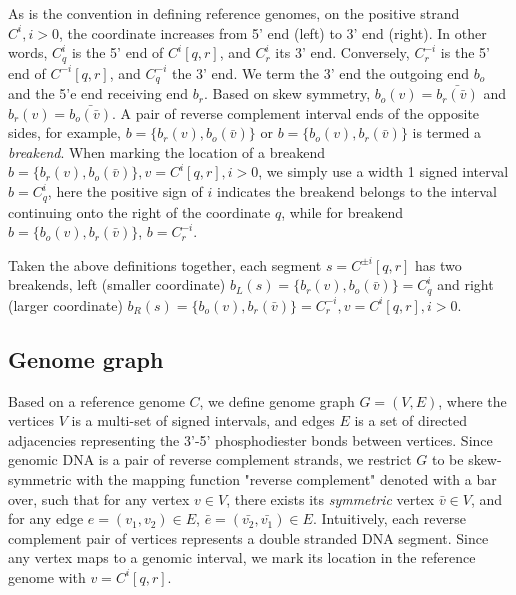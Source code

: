 \documentclass[phd,tocprelim]{cornell}
\begin{document}
As is the convention in defining reference genomes, on the positive strand $C^i, i>0$, the coordinate increases from 5' end (left) to 3' end (right). In other words, $C^{i}_q$ is the 5' end of $C^{i}[q,r]$, and $C^{i}_r$ its 3' end. Conversely, $C^{-i}_r$ is the 5' end of $C^{-i}[q,r]$, and $C^{-i}_q$ the 3' end. We term the 3' end the outgoing end $b_o$ and the 5'e end receiving end $b_r$. Based on skew symmetry, $b_o (v)= \bar{b_r(\bar{v})}$ and $b_r(v) = \bar{b_o(\bar{v})}$. A pair of reverse complement interval ends of the opposite sides, for example, $b = \{b_r(v), b_o(\bar{v})\}$ or $b = \{b_o(v), b_r(\bar{v})\}$ is termed a \textit{breakend}. When marking the location of a breakend $b = \{b_r(v), b_o(\bar{v})\}, v = C^{i}[q,r], i>0$, we simply use a width 1 signed interval $b = C^{i}_{q}$, here the positive sign of $i$ indicates the breakend belongs to the interval continuing onto the right of the coordinate $q$, while for breakend $b = \{b_o(v), b_r(\bar{v})\}$, $b = C^{-i}_r$.

Taken the above definitions together, each segment $s = C^{\pm{i}}[q,r]$ has two breakends, left (smaller coordinate) $b_L(s) = \{b_r(v), b_o(\bar{v})\} = C^{i}_q$ and right (larger coordinate) $b_R(s) = \{b_o(v), b_r(\bar{v})\} = C^{-i}_{r}, v = C^{i}[q,r], i>0$.

\subsection{Genome graph}
Based on a reference genome $C$, we define genome graph $G = (V, E)$, where the vertices $V$ is a multi-set of signed intervals, and edges $E$ is a set of directed adjacencies representing the 3'-5' phosphodiester bonds between vertices. Since genomic DNA is a pair of reverse complement strands, we restrict $G$ to be skew-symmetric \cite{Goldberg1996-qm} with the mapping function "reverse complement" denoted with a bar over, such that for any vertex $v \in V$, there exists its \textit{symmetric} vertex $\bar{v} \in V$, and for any edge $e = (v_1, v_2) \in E$, $\bar{e} = (\bar{v_2}, \bar{v_1}) \in E$. Intuitively, each reverse complement pair of vertices represents a double stranded DNA segment. Since any vertex maps to a genomic interval, we mark its location in the reference genome with $v = C^{i}[q,r]$.
\end{document}
